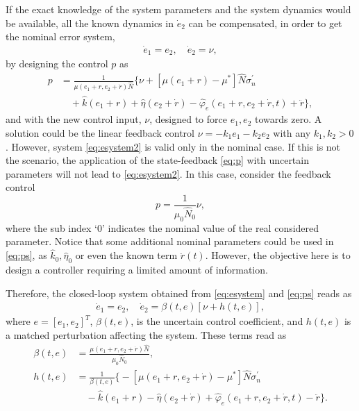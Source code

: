 \documentclass[journal,twoside,web]{ieeecolor}
\begin{document}
If the exact knowledge of the system parameters and the system dynamics would be available, all the known dynamics in $\dot{e}_2$ can be compensated, in order to get the nominal error system,
\begin{equation}
\begin{split}
  \dot{e}_1=e_2,\quad
  \dot{e}_2=\nu,
  \label{eq:esystem2}
\end{split} 
\end{equation}
by designing the control $p$ as
\begin{equation}
\begin{split}
  p &= \frac{1}{\mu(e_1+r,e_2+\dot{r})\hat{N}}\Big\{ \nu + [\mu(e_1+r)-\mu^*]\hat{N}\sigma_n^\prime \\ 
  & \quad + \hat{k}(e_1+r) + \hat{\eta}(e_2+\dot{r})  -\hat{\varphi}_e(e_1+r,e_2+\dot{r},t) + \ddot{r}\Big\},
  \label{eq:p}
\end{split}
\end{equation}
and with the new control input, $\nu$, designed to force $e_1,e_2$ towards zero. A solution could be the linear feedback control $\nu=-k_1 e_1 - k_2 e_2$ with any $k_1,k_2>0$. However, system \eqref{eq:esystem2} is valid only in the nominal case. If this is not the scenario, the application of the state-feedback \eqref{eq:p} with uncertain parameters will not lead to \eqref{eq:esystem2}. In this case, consider the feedback control
\begin{equation}
  p = \frac{1}{\mu_0 \hat{N}_0}\nu,
  \label{eq:ps}
\end{equation}
where the sub index `0' indicates the nominal value of the real considered parameter. Notice that some additional nominal parameters could be used in \eqref{eq:ps}, as $\hat{k}_0,\hat{\eta}_0$ or even the known term $\ddot{r}(t)$. However, the objective here is to design a controller requiring a limited amount of information.

Therefore, the closed-loop system obtained from \eqref{eq:esystem} and \eqref{eq:ps} reads as
\begin{equation}
\begin{split}
  \dot{e}_1=e_2,\quad
  \dot{e}_2=\beta(t,e)\left[\nu + h(t,e) \right],
  \label{eq:esystem3}
\end{split} 
\end{equation}
where $e=[e_1,e_2]^T$, $\beta(t,e)$, is the uncertain control coefficient, and $h(t,e)$ is a matched perturbation affecting the system. These terms read as
{\small
\begin{equation}
\begin{split}
  \beta(t,e) &= \frac{\mu(e_1+r,e_2+\dot{r})\hat{N}}{\mu_0 \hat{N}_0}, \\
  h(t,e) &= \frac{1}{\beta(t,e)}\Big\{-[\mu(e_1+r,e_2+\dot{r})-\mu^*]\hat{N}\sigma_n^\prime \\ & \quad -\hat{k}(e_1+r) - \hat{\eta}(e_2+\dot{r})+\hat{\varphi}_e(e_1+r,e_2+\dot{r},t)-\ddot{r} \Big\}.
\end{split}
\end{equation}}
\end{document}
